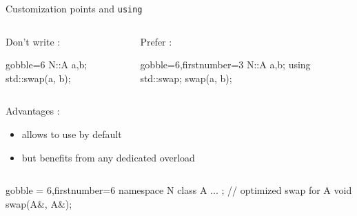 \begin{frame}[fragile]
  \begin{block}{Customization points and \texttt{using}}
    \begin{columns}[t]
      \begin{column}{.35\textwidth}
        Don't write :
        \begin{cppcode*}{gobble=6}
          N::A a,b;
          std::swap(a, b);
        \end{cppcode*}
      \end{column}
      \begin{column}{.35\textwidth}
        Prefer :
        \begin{cppcode*}{gobble=6,firstnumber=3}
          N::A a,b;
          using std::swap;
          swap(a, b);
        \end{cppcode*}
      \end{column}
    \end{columns}
    \vspace{.2cm}
    Advantages :
    \begin{itemize}
    \item allows to use  by default
    \item but benefits from any dedicated overload
    \end{itemize}
    \begin{columns}
      \begin{column}{.7\textwidth}
        \begin{cppcode*}{gobble = 6,firstnumber=6}
          namespace N {
            class A { ... };
            // optimized swap for A
            void swap(A&, A&);
          }
        \end{cppcode*}
      \end{column}
    \end{columns}
  \end{block}
\end{frame}

